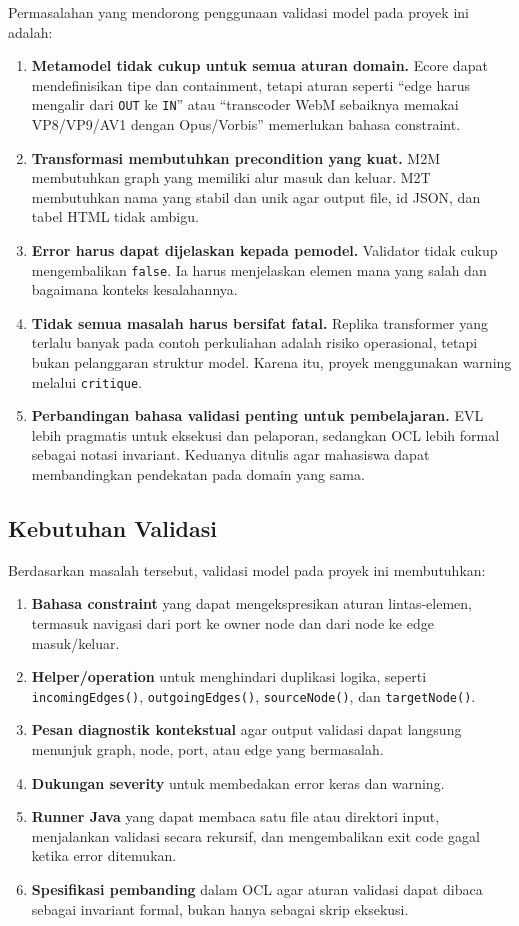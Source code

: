 Permasalahan yang mendorong penggunaan validasi model pada proyek ini adalah:
\begin{enumerate}
  \item \textbf{Metamodel tidak cukup untuk semua aturan domain.} Ecore dapat mendefinisikan tipe dan containment, tetapi aturan seperti ``edge harus mengalir dari \texttt{OUT} ke \texttt{IN}'' atau ``transcoder WebM sebaiknya memakai VP8/VP9/AV1 dengan Opus/Vorbis'' memerlukan bahasa constraint.
  \item \textbf{Transformasi membutuhkan precondition yang kuat.} M2M membutuhkan graph yang memiliki alur masuk dan keluar. M2T membutuhkan nama yang stabil dan unik agar output file, id JSON, dan tabel HTML tidak ambigu.
  \item \textbf{Error harus dapat dijelaskan kepada pemodel.} Validator tidak cukup mengembalikan \texttt{false}. Ia harus menjelaskan elemen mana yang salah dan bagaimana konteks kesalahannya.
  \item \textbf{Tidak semua masalah harus bersifat fatal.} Replika transformer yang terlalu banyak pada contoh perkuliahan adalah risiko operasional, tetapi bukan pelanggaran struktur model. Karena itu, proyek menggunakan warning melalui \texttt{critique}.
  \item \textbf{Perbandingan bahasa validasi penting untuk pembelajaran.} EVL lebih pragmatis untuk eksekusi dan pelaporan, sedangkan OCL lebih formal sebagai notasi invariant. Keduanya ditulis agar mahasiswa dapat membandingkan pendekatan pada domain yang sama.
\end{enumerate}

\subsection{Kebutuhan Validasi}

Berdasarkan masalah tersebut, validasi model pada proyek ini membutuhkan:
\begin{enumerate}
  \item \textbf{Bahasa constraint} yang dapat mengekspresikan aturan lintas-elemen, termasuk navigasi dari port ke owner node dan dari node ke edge masuk/keluar.
  \item \textbf{Helper/operation} untuk menghindari duplikasi logika, seperti \texttt{incomingEdges()}, \texttt{outgoingEdges()}, \texttt{sourceNode()}, dan \texttt{targetNode()}.
  \item \textbf{Pesan diagnostik kontekstual} agar output validasi dapat langsung menunjuk graph, node, port, atau edge yang bermasalah.
  \item \textbf{Dukungan severity} untuk membedakan error keras dan warning.
  \item \textbf{Runner Java} yang dapat membaca satu file atau direktori input, menjalankan validasi secara rekursif, dan mengembalikan exit code gagal ketika error ditemukan.
  \item \textbf{Spesifikasi pembanding} dalam OCL agar aturan validasi dapat dibaca sebagai invariant formal, bukan hanya sebagai skrip eksekusi.
\end{enumerate}

